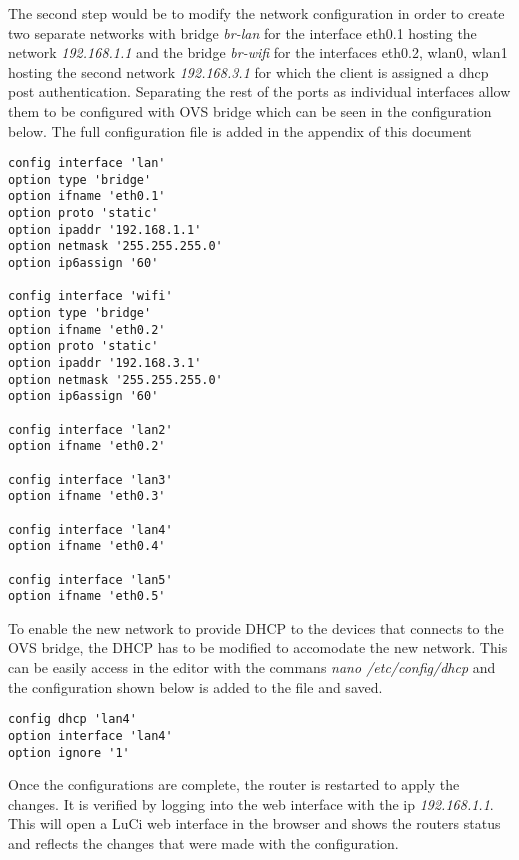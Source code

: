 The second step would be to modify the network configuration in order to create two separate networks with bridge \textit{br-lan} for the interface eth0.1 hosting the network \textit{192.168.1.1} and the bridge \textit{br-wifi} for the interfaces eth0.2, wlan0, wlan1 hosting the second network \textit{192.168.3.1} for which the client is assigned a dhcp post authentication. Separating the rest of the ports as individual interfaces allow them to be configured with OVS bridge which can be seen in the configuration below. The full configuration file is added in the appendix of this document 

\begin{lstlisting}
config interface 'lan'
option type 'bridge'
option ifname 'eth0.1'
option proto 'static'
option ipaddr '192.168.1.1'
option netmask '255.255.255.0'
option ip6assign '60'

config interface 'wifi'
option type 'bridge'
option ifname 'eth0.2'
option proto 'static'
option ipaddr '192.168.3.1'
option netmask '255.255.255.0'
option ip6assign '60'

config interface 'lan2'
option ifname 'eth0.2'

config interface 'lan3'
option ifname 'eth0.3'

config interface 'lan4'
option ifname 'eth0.4'

config interface 'lan5'
option ifname 'eth0.5'

\end{lstlisting}

To enable the new network to provide DHCP to the devices that connects to the OVS bridge, the DHCP has to be modified to accomodate the new network. This can be easily access in the editor with the commans \textit{nano /etc/config/dhcp} and the configuration shown below  is added to the file and saved.

\begin{lstlisting}
config dhcp 'lan4'
option interface 'lan4'
option ignore '1'
\end{lstlisting}

Once the configurations are complete, the router is restarted to apply the changes. It is verified by logging into the web interface with the ip \textit{192.168.1.1}. This will open a LuCi web interface in the browser and shows the routers status and reflects the changes that were made with the configuration.

